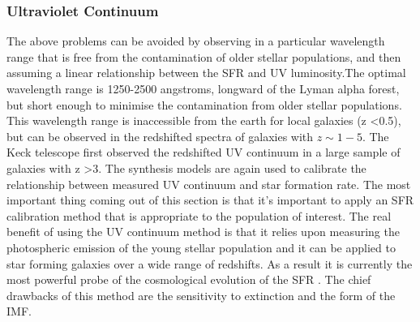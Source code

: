 \documentclass{literature}
\begin{document}
\subsubsection{Ultraviolet Continuum}   
The above problems can be avoided by observing in a particular wavelength range that is free from the contamination of older stellar populations, and then assuming a linear relationship between the SFR and UV luminosity.The optimal wavelength range is 1250-2500 angstroms, longward of the Lyman alpha forest, but short enough to minimise the contamination from older stellar populations. This wavelength range is inaccessible from the earth for local galaxies (z   \textless 0.5), but can be observed in the redshifted spectra of galaxies with $z \sim 1-5$. The Keck telescope first observed the redshifted UV continuum in a large sample of galaxies with z \textgreater 3. The synthesis models are again used to calibrate the relationship between measured UV continuum and star formation rate. The most important thing coming out of this section is that it's important to apply an SFR calibration method that is appropriate to the population of interest. The real benefit of using the UV continuum method is that it relies upon measuring the photospheric emission of the young stellar population and it can be applied to star forming galaxies over a wide range of redshifts. As a result it is currently the most powerful probe of the cosmological evolution of the SFR \citep{Madau1996}. The chief drawbacks of this method are the sensitivity to extinction and the form of the IMF.
\end{document}
